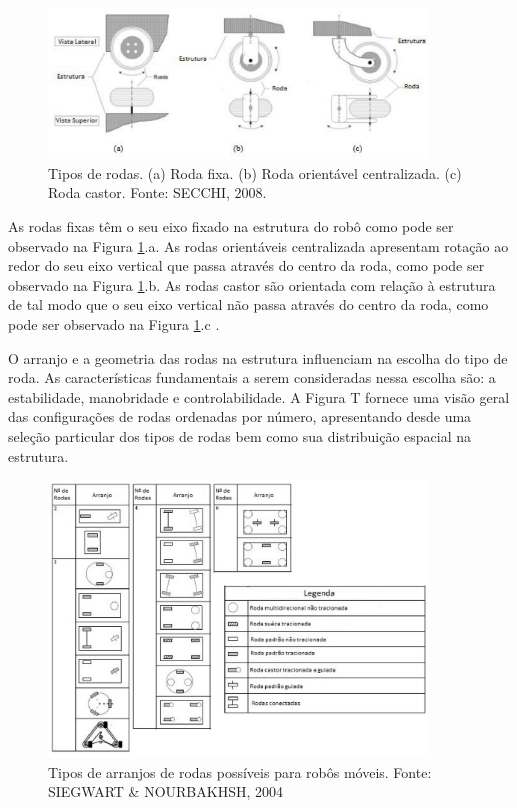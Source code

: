 \begin{figure}[H]
    \centering
    \includegraphics[width=0.9\textwidth]{figuras/roda.eps}
    \caption{Tipos de rodas. (a) Roda fixa. (b) Roda orientável centralizada. (c) Roda castor. Fonte: SECCHI, 2008.}
    \label{fig:roda}
\end{figure}

As rodas fixas têm o seu eixo fixado na estrutura do robô como pode ser observado na Figura \ref{fig:roda}.a. As rodas orientáveis centralizada
apresentam rotação ao redor do seu eixo vertical que passa através do centro da roda, como pode ser observado na Figura \ref{fig:roda}.b. As
rodas castor são orientada com relação à estrutura de tal modo que o seu eixo vertical não passa através do centro da roda, como
pode ser observado na Figura \ref{fig:roda}.c \cite{secchi:2008}. 

O arranjo e a geometria das rodas na estrutura influenciam na escolha do tipo de roda. As características fundamentais a serem
consideradas nessa escolha são: a estabilidade, manobridade e controlabilidade. A Figura T fornece uma visão geral das configurações
de rodas ordenadas por número, apresentando desde uma seleção particular dos tipos de rodas bem como sua distribuição espacial na estrutura.

\begin{figure}[H]
    \centering
    \includegraphics[width=0.9\textwidth]{figuras/arranjos_roda.eps}
    \caption{Tipos de arranjos de rodas possíveis para robôs móveis. Fonte: SIEGWART \& NOURBAKHSH, 2004}
    \label{fig:arranjo_roda}
\end{figure}

